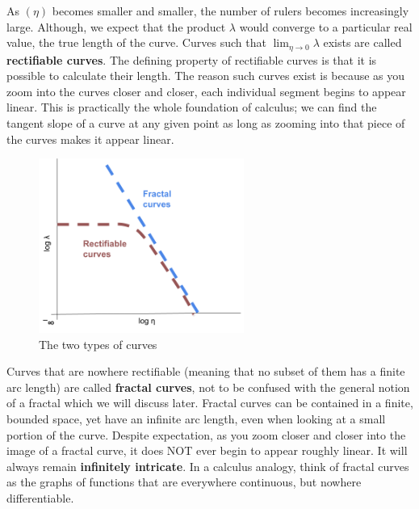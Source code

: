 As $(\eta)$ becomes smaller and smaller, the number of rulers becomes increasingly large. Although, we expect that the product $\lambda$ would converge to a particular real value, the true length of the curve. Curves such that $\displaystyle \lim_{\eta\to0}\lambda$ exists are called \textbf{rectifiable curves}. The defining property of rectifiable curves is that it is possible to calculate their length. The reason such curves exist is because as you zoom into the curves closer and closer, each individual segment begins to appear linear. This is practically the whole foundation of calculus; we can find the tangent slope of a curve at any given point as long as zooming into that piece of the curves makes it appear linear. \\

\begin{figure}
  \begin{center}
    \includegraphics[width=0.6\textwidth]{Images/1.1.2.png}
  \end{center}
  \caption{The two types of curves}
\end{figure}

Curves that are nowhere rectifiable (meaning that no subset of them has a finite arc length) are called \textbf{fractal curves}, not to be confused with the general notion of a fractal which we will discuss later. Fractal curves can be contained in a finite, bounded space, yet have an infinite arc length, even when looking at a small portion of the curve. Despite expectation, as you zoom closer and closer into the image of a fractal curve, it does NOT ever begin to appear roughly linear. It will always remain \textbf{infinitely intricate}. In a calculus analogy, think of fractal curves as the graphs of functions that are everywhere continuous, but nowhere differentiable. \\

